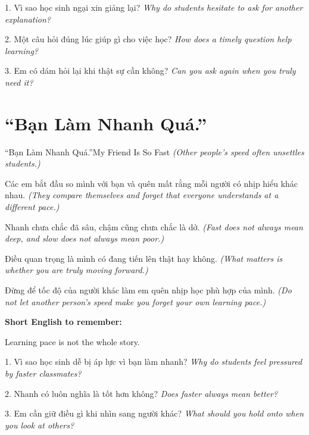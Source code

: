 \begin{tuhocnhanh}
1. Vì sao học sinh ngại xin giảng lại? \textit{Why do students hesitate to ask for another explanation?}

2. Một câu hỏi đúng lúc giúp gì cho việc học? \textit{How does a timely question help learning?}

3. Em có dám hỏi lại khi thật sự cần không? \textit{Can you ask again when you truly need it?}
\end{tuhocnhanh}
\ngancach

\section{``Bạn Làm Nhanh Quá.''}
\begin{truyen}{``Bạn Làm Nhanh Quá.''}{My Friend Is So Fast}
\textit{(Other people's speed often unsettles students.)}

Các em bắt đầu so mình với bạn và quên mất rằng mỗi người có nhịp hiểu khác nhau.
\textit{(They compare themselves and forget that everyone understands at a different pace.)}

Nhanh chưa chắc đã sâu, chậm cũng chưa chắc là dở.
\textit{(Fast does not always mean deep, and slow does not always mean poor.)}

Điều quan trọng là mình có đang tiến lên thật hay không.
\textit{(What matters is whether you are truly moving forward.)}
\end{truyen}

\begin{baihoc}
Đừng để tốc độ của người khác làm em quên nhịp học phù hợp của mình.
\textit{(Do not let another person's speed make you forget your own learning pace.)}
\end{baihoc}

\begin{ghinhoanh}
\textbf{Short English to remember:}

Learning pace is not the whole story.

\end{ghinhoanh}

\begin{tuhocnhanh}
1. Vì sao học sinh dễ bị áp lực vì bạn làm nhanh? \textit{Why do students feel pressured by faster classmates?}

2. Nhanh có luôn nghĩa là tốt hơn không? \textit{Does faster always mean better?}

3. Em cần giữ điều gì khi nhìn sang người khác? \textit{What should you hold onto when you look at others?}
\end{tuhocnhanh}
\ngancach

